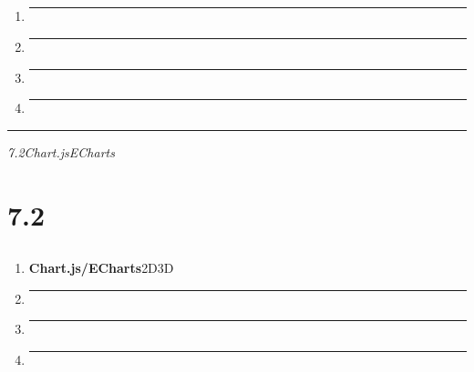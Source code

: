 \subsection{}\label{section-26}

\begin{enumerate}
\def\labelenumi{\arabic{enumi}.}
\item
  \begin{center}\rule{0.5\linewidth}{0.5pt}\end{center}
\item
  \begin{center}\rule{0.5\linewidth}{0.5pt}\end{center}
\item
  \begin{center}\rule{0.5\linewidth}{0.5pt}\end{center}
\item
  \begin{center}\rule{0.5\linewidth}{0.5pt}\end{center}
\end{enumerate}

\begin{center}\rule{0.5\linewidth}{0.5pt}\end{center}

\emph{7.2Chart.jsECharts}

\section{7.2}\label{section-27}

\subsection{}\label{section-28}

\begin{enumerate}
\def\labelenumi{\arabic{enumi}.}
\item
  \textbf{Chart.js/ECharts}2D3D
\item
  \begin{center}\rule{0.5\linewidth}{0.5pt}\end{center}
\item
  \begin{center}\rule{0.5\linewidth}{0.5pt}\end{center}
\item
  \begin{center}\rule{0.5\linewidth}{0.5pt}\end{center}
\end{enumerate}

